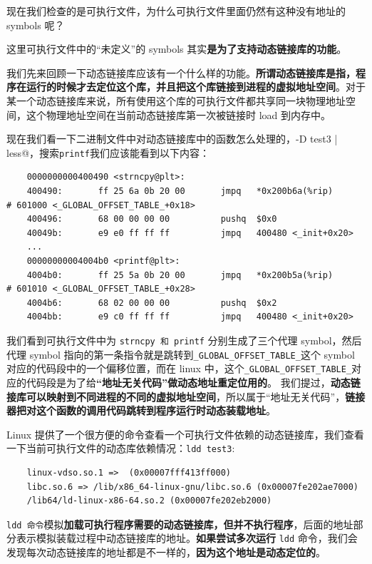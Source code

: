 \documentclass[UTF8,a4paper,12pt]{ctexbook}
\begin{document}
			现在我们检查的是可执行文件，为什么可执行文件里面仍然有这种没有地址的 symbols 呢？
			
			这里可执行文件中的“未定义”的 symbols 其实\textbf{是为了支持动态链接库的功能}。
			
			我们先来回顾一下动态链接库应该有一个什么样的功能。\textbf{所谓动态链接库是指，程序在运行的时候才去定位这个库，并且把这个库链接到进程的虚拟地址空间}。对于某一个动态链接库来说，所有使用这个库的可执行文件都共享同一块物理地址空间，这个物理地址空间在当前动态链接库第一次被链接时 load 到内存中。
			
			现在我们看一下二进制文件中对动态链接库中的函数怎么处理的，\verb@objdump -D test3 | less@，搜索\verb|printf|我们应该能看到以下内容：
			\begin{lstlisting}
	0000000000400490 <strncpy@plt>:
	400490:       ff 25 6a 0b 20 00       jmpq   *0x200b6a(%rip)        # 601000 <_GLOBAL_OFFSET_TABLE_+0x18>
	400496:       68 00 00 00 00          pushq  $0x0
	40049b:       e9 e0 ff ff ff          jmpq   400480 <_init+0x20>
	...
	00000000004004b0 <printf@plt>:
	4004b0:       ff 25 5a 0b 20 00       jmpq   *0x200b5a(%rip)        # 601010 <_GLOBAL_OFFSET_TABLE_+0x28>
	4004b6:       68 02 00 00 00          pushq  $0x2
	4004bb:       e9 c0 ff ff ff          jmpq   400480 <_init+0x20>
			\end{lstlisting}
			
			我们看到可执行文件中为 \verb|strncpy 和 printf| 分别生成了三个代理 symbol，然后代理 symbol 指向的第一条指令就是跳转到\verb|_GLOBAL_OFFSET_TABLE_|这个 symbol 对应的代码段中的一个偏移位置，而在 linux 中，这个\verb|_GLOBAL_OFFSET_TABLE_|对应的代码段是为了给\textbf{“地址无关代码”做动态地址重定位用的}。
			我们提过，\textbf{动态链接库可以映射到不同进程的不同的虚拟地址空间}，所以属于“地址无关代码”，\textbf{链接器把对这个函数的调用代码跳转到程序运行时动态装载地址}。
			
			Linux 提供了一个很方便的命令查看一个可执行文件依赖的动态链接库，我们查看一下当前可执行文件的动态库依赖情况：\verb|ldd test3|:
			\begin{lstlisting}
    linux-vdso.so.1 =>  (0x00007fff413ff000)
    libc.so.6 => /lib/x86_64-linux-gnu/libc.so.6 (0x00007fe202ae7000)
    /lib64/ld-linux-x86-64.so.2 (0x00007fe202eb2000)	
			\end{lstlisting}
			
			\verb|ldd 命令|模拟\textbf{加载可执行程序需要的动态链接库，但并不执行程序}，后面的地址部分表示模拟装载过程中动态链接库的地址。\textbf{如果尝试多次运行} \verb|ldd| 命令，我们会发现每次动态链接库的地址都是不一样的，\textbf{因为这个地址是动态定位的}。
			
\end{document}
